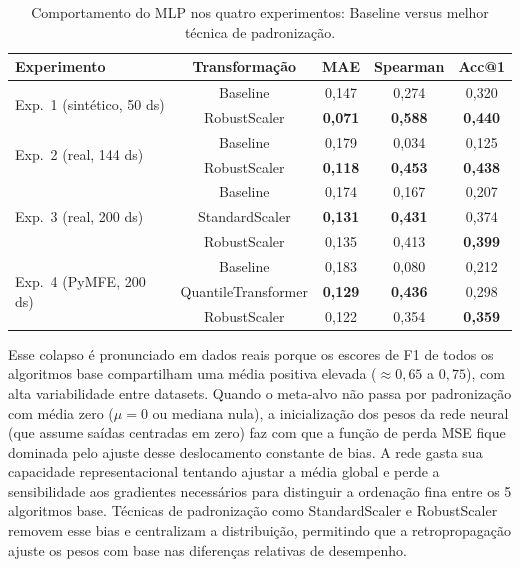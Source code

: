 \documentclass[12pt]{article}
\begin{document}
\begin{table}[ht]
\centering
\caption{Comportamento do MLP nos quatro experimentos: Baseline versus melhor técnica de padronização.}
\label{tab:mlp_comparison}
\small
\begin{tabular}{lcccc}
\toprule
\textbf{Experimento} & \textbf{Transformação} & \textbf{MAE} & \textbf{Spearman} & \textbf{Acc@1} \\
\midrule
\multirow{2}{*}{Exp.\ 1 (sintético, 50 ds)} & Baseline     & 0,147 & 0,274 & 0,320 \\
                                             & RobustScaler & \textbf{0,071} & \textbf{0,588} & \textbf{0,440} \\
\midrule
\multirow{2}{*}{Exp.\ 2 (real, 144 ds)}     & Baseline     & 0,179 & 0,034 & 0,125 \\
                                             & RobustScaler & \textbf{0,118} & \textbf{0,453} & \textbf{0,438} \\
\midrule
\multirow{3}{*}{Exp.\ 3 (real, 200 ds)}     & Baseline     & 0,174 & 0,167 & 0,207 \\
                                             & StandardScaler & \textbf{0,131} & \textbf{0,431} & 0,374 \\
                                             & RobustScaler & 0,135 & 0,413 & \textbf{0,399} \\
\midrule
\multirow{3}{*}{Exp.\ 4 (PyMFE, 200 ds)}    & Baseline     & 0,183 & 0,080 & 0,212 \\
                                             & QuantileTransformer & \textbf{0,129} & \textbf{0,436} & 0,298 \\
                                             & RobustScaler & 0,122 & 0,354 & \textbf{0,359} \\
\bottomrule
\end{tabular}
\end{table}

Esse colapso é pronunciado em dados reais porque os escores de F1 de todos os algoritmos base compartilham uma média positiva elevada ($\approx 0{,}65$ a $0{,}75$), com alta variabilidade entre datasets. Quando o meta-alvo não passa por padronização com média zero ($\mu=0$ ou mediana nula), a inicialização dos pesos da rede neural (que assume saídas centradas em zero) faz com que a função de perda MSE fique dominada pelo ajuste desse deslocamento constante de bias. A rede gasta sua capacidade representacional tentando ajustar a média global e perde a sensibilidade aos gradientes necessários para distinguir a ordenação fina entre os 5 algoritmos base. Técnicas de padronização como StandardScaler e RobustScaler removem esse bias e centralizam a distribuição, permitindo que a retropropagação ajuste os pesos com base nas diferenças relativas de desempenho.
\end{document}
